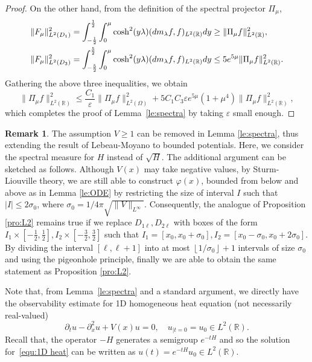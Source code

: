 \documentclass[a4paper,reqno]{amsart}
\theoremstyle{definition}
\newtheorem{remark}[theorem]{Remark}
\numberwithin{equation}{section}
\newcommand{\R}{\mathbb{R}}
\def \R {{\mathbb{R} }}
\def \d {{\rm{d}}}
\begin{document}
\begin{proof}
On the other hand, from the definition of the spectral projector $\Pi_{\mu}$,
\begin{equation*}
\begin{aligned}
\|F_{\mu}\|_{L^{2}(D_{1})}^{2}
&=\int_{-\frac{1}{2}}^{\frac{1}{2}}\int_{0}^{\mu}\cosh^{2}(y\lambda)(\d m_{\lambda}f,f)_{L^{2}(\R)}\d y\ge \|\Pi_{\mu}f\|_{L^{2}(\R)}^{2},\\
\|F_{\mu}\|_{L^{2}(D_{3})}^{2}
&=\int_{-\frac{5}{2}}^{\frac{5}{2}}\int_{0}^{\mu}\cosh^{2}(y\lambda)(\d m_{\lambda}f,f)_{L^{2}(\R)}\d y\le 5e^{5\mu}\|\Pi_{\mu}f\|_{L^{2}(\R)}^{2}.
\end{aligned}
\end{equation*}
Gathering the above three inequalities, we obtain
\begin{equation*}
\|\Pi_{\mu}f\|_{L^{2}(\R)}^{2}\le \frac{C_{1}}{\varepsilon}\|\Pi_{\mu}f\|_{L^{2}(\Omega)}^{2}
+5C_{1}C_{3}\varepsilon e^{5\mu}(1+\mu^{4})\|\Pi_{\mu}f\|_{L^{2}(\R)}^{2},
\end{equation*}
which completes the proof of Lemma~\ref{le:spectra} by taking $\varepsilon$ small enough.
\end{proof}

\begin{remark}
	The assumption $V\geq 1$ can be removed in Lemma \ref{le:spectra}, thus extending the result of Lebeau-Moyano \cite{LeM} to bounded potentials. Here, we consider the spectral measure for $H$ instead of $\sqrt{H}$. The additional argument can be sketched as follows. Although $V(x)$ may take negative values, by Sturm-Liouville theory, we are still able to construct $\varphi(x)$, bounded from below and above as in Lemma \ref{le:ODE} by restricting the size of interval $I$ such that $|I|\leq 2\sigma_0$, where $\sigma_0=1/4\pi\sqrt{\|V\|_{L^{\infty}}}$.  Consequently, the analogue of Proposition \ref{pro:L2} remains true if we replace $D_{1\ell}, D_{2\ell}$ with boxes of the form  $I_1\times\left[-\frac{1}{2},\frac{1}{2}\right], I_2\times\left[-\frac{3}{2},\frac{3}{2}\right]$ such that $I_1=[x_0,x_0+\sigma_0], I_2=[x_0-\sigma_0, x_0+2\sigma_0]$.  By dividing the interval $[\ell,\ell+1]$ into at most $\left\lfloor1/\sigma_0\right\rfloor+1$ intervals of size $\sigma_0$ and using the pigeonhole principle, finally we are able to obtain the same statement as Proposition \ref{pro:L2}.  	
\end{remark}


Note that, from Lemma~\ref{le:spectra} and a standard argument, we directly have the observability estimate for 1D homogeneous heat equation (not necessarily real-valued)
\begin{equation}\label{equ:1D heat}
    \partial_{t}u-\partial_{x}^{2}u+V(x)u=0,\quad  u_{|t=0}=u_{0}\in L^{2}(\R).
\end{equation}
Recall that, the operator $-H$ generates a semigroup $e^{-tH}$ and so the solution for~\eqref{equ:1D heat} can be written as $u(t)=e^{-t{H}}u_{0}\in L^{2}(\R)$.
\end{document}
